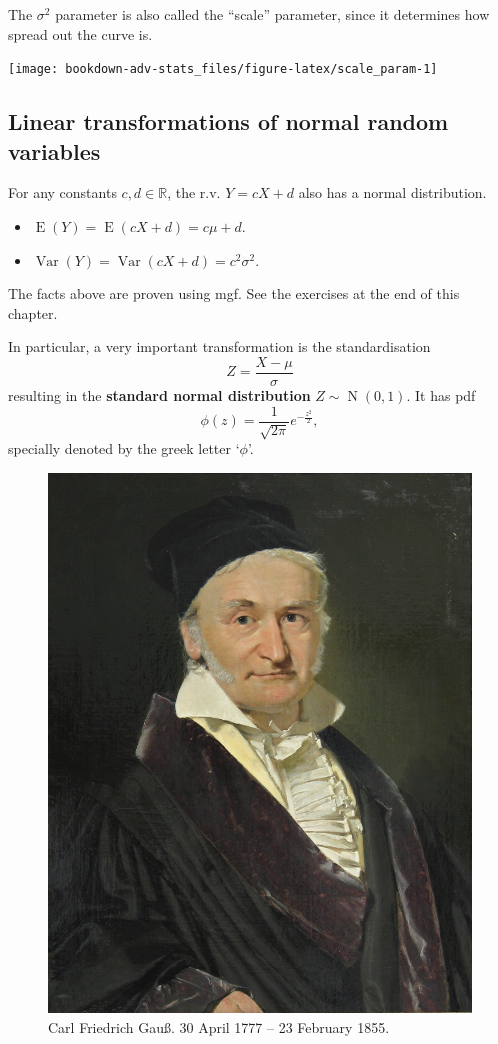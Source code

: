\documentclass[
]{book}
\providecommand{\tightlist}{%
  \setlength{\itemsep}{0pt}\setlength{\parskip}{0pt}}
\DeclareMathOperator{\E}{E}
\DeclareMathOperator{\Var}{Var}
\DeclareMathOperator{\N}{N}
\newcommand{\bbR}{\mathbb{R}}
\theoremstyle{definition}
\theoremstyle{definition}
\theoremstyle{definition}
\theoremstyle{definition}
\theoremstyle{remark}
\begin{document}
The \(\sigma^2\) parameter is also called the ``scale'' parameter, since it determines how spread out the curve is.

\begin{center}\texttt{[image: bookdown-adv-stats\_files/figure-latex/scale\_param-1]} \end{center}

\hypertarget{linear-transformations-of-normal-random-variables}{%
\subsection{Linear transformations of normal random variables}\label{linear-transformations-of-normal-random-variables}}

For any constants \(c, d \in \bbR\), the r.v. \(Y=cX + d\) also has a normal distribution.

\begin{itemize}
\tightlist
\item
  \(\E(Y)=\E(cX+d)=c\mu + d\).
\item
  \(\Var(Y) = \Var(cX+d) = c^2 \sigma^2\).
\end{itemize}

The facts above are proven using mgf. See the exercises at the end of this chapter.

In particular, a very important transformation is the standardisation
\[
  Z = \frac{X-\mu}{\sigma}
\]
resulting in the \textbf{standard normal distribution} \(Z\sim\N(0,1)\).
It has pdf
\[
\phi(z) = \frac{1}{\sqrt{2\pi}}e^{-\frac{z^2}{2}},
\]
specially denoted by the greek letter `\(\phi\)'.

\begin{figure}

{\centering \includegraphics[width=0.6\linewidth]{figure/gauss} 

}

\caption{Carl Friedrich Gauß. 30 April 1777 -- 23 February 1855.}\label{fig:gauss}
\end{figure}
\end{document}

